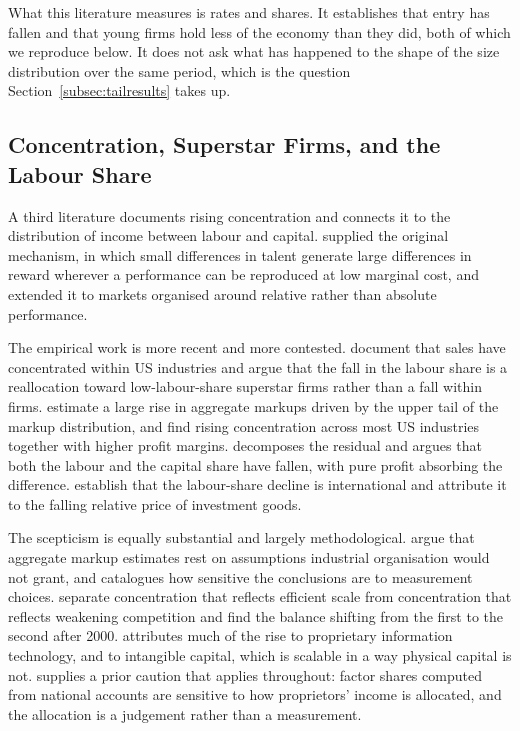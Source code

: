\documentclass[jrfm,article,submit,pdftex,moreauthors]{Definitions/mdpi}
\begin{document}
What this literature measures is rates and shares. It establishes that entry has fallen and
that young firms hold less of the economy than they did, both of which we reproduce below.
It does not ask what has happened to the shape of the size distribution over the same
period, which is the question Section~\ref{subsec:tailresults} takes up.

\subsection{Concentration, Superstar Firms, and the Labour Share}
\label{subsec:lit_concentration}

A third literature documents rising concentration and connects it to the distribution of
income between labour and capital. \citet{Rosen1981} supplied the original mechanism, in
which small differences in talent generate large differences in reward wherever a
performance can be reproduced at low marginal cost, and \citet{FrankCook1995} extended it to
markets organised around relative rather than absolute performance.

The empirical work is more recent and more contested. \citet{AutorEtAl2020} document that
sales have concentrated within US industries and argue that the fall in the labour share is
a reallocation toward low-labour-share superstar firms rather than a fall within firms.
\citet{DeLoeckerEeckhoutUnger2020} estimate a large rise in aggregate markups driven by the
upper tail of the markup distribution, and \citet{GrullonLarkinMichaely2019} find rising
concentration across most US industries together with higher profit margins.
\citet{Barkai2020} decomposes the residual and argues that both the labour and the capital
share have fallen, with pure profit absorbing the difference.
\citet{KarabarbounisNeiman2014} establish that the labour-share decline is international and
attribute it to the falling relative price of investment goods.

The scepticism is equally substantial and largely methodological.
\citet{BerryGaynorScottMorton2019} argue that aggregate markup estimates rest on assumptions
industrial organisation would not grant, and \citet{Syverson2019} catalogues how sensitive
the conclusions are to measurement choices. \citet{CovarrubiasGutierrezPhilippon2020}
separate concentration that reflects efficient scale from concentration that reflects
weakening competition and find the balance shifting from the first to the second after
2000. \citet{Bessen2020} attributes much of the rise to proprietary information technology,
and \citet{CrouzetEberly2019} to intangible capital, which is scalable in a way physical
capital is not. \citet{Gollin2002} supplies a prior caution that applies throughout: factor
shares computed from national accounts are sensitive to how proprietors' income is
allocated, and the allocation is a judgement rather than a measurement.
\end{document}

